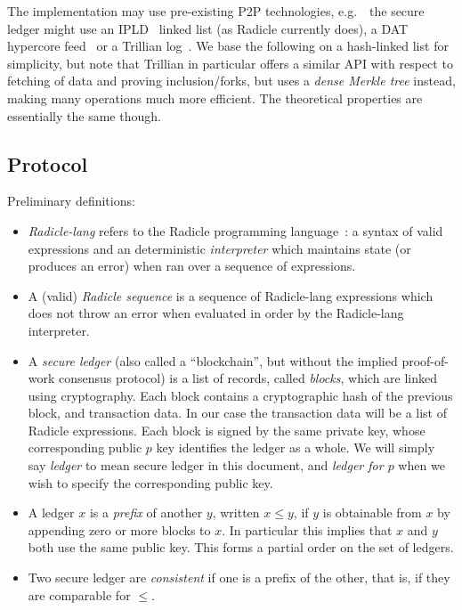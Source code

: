 \documentclass[a4paper, oneside, 10pt]{amsart}
\newcommand*\eg{e.g.\ }
\begin{document}
The implementation may use pre-existing P2P technologies, \eg~the secure ledger
might use an IPLD~\cite{ipld} linked list (as Radicle currently does), a DAT
hypercore feed~\cite{dat} or a Trillian log~\cite{trillian}. We base the
following on a hash-linked list for simplicity, but note that Trillian in
particular offers a similar API with respect to fetching of data and proving
inclusion/forks, but uses a \emph{dense Merkle tree} instead, making many
operations much more efficient. The theoretical properties are essentially the
same though.

\subsection{Protocol}

Preliminary definitions:
\begin{itemize}
\item
  \emph{Radicle-lang} refers to the Radicle programming language~\cite{radicle}:
  a syntax of valid expressions and an deterministic \emph{interpreter} which
  maintains state (or produces an error) when ran over a sequence of
  expressions.
\item
  A (valid) \emph{Radicle sequence} is a sequence of Radicle-lang expressions
  which does not throw an error when evaluated in order by the Radicle-lang
  interpreter.
\item
  A \emph{secure ledger} (also called a ``blockchain'', but without the implied
  proof-of-work consensus protocol) is a list of records, called \emph{blocks},
  which are linked using cryptography. Each block contains a cryptographic hash
  of the previous block, and transaction data. In our case the transaction data
  will be a list of Radicle expressions. Each block is signed by the same
  private key, whose corresponding public $p$ key identifies the ledger as a
  whole. We will simply say \emph{ledger} to mean secure ledger in this
  document, and \emph{ledger for $p$} when we wish to specify the corresponding
  public key.
\item
  A ledger $x$ is a \emph{prefix} of another $y$, written $x \leq y$, if $y$ is
  obtainable from $x$ by appending zero or more blocks to $x$. In particular
  this implies that $x$ and $y$ both use the same public key. This forms a
  partial order on the set of ledgers.
\item Two secure ledger are \emph{consistent} if one is a prefix of the other,
  that is, if they are comparable for $\leq$.
\end{itemize}
\end{document}
